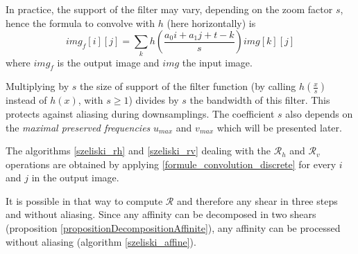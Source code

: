 \noindent	In practice, the support of the filter may vary, depending on the zoom factor $s$, hence the formula to convolve with $h$ (here horizontally) is 
	\begin{equation}
	img_f[i][j] = \displaystyle{\sum_k}h\left(\frac{a_0i+a_1j+t-k}{s}\right)img[k][j]
	\label{formule_convolution_discrete}
	\end{equation}
	where $img_f$ is the output image and $img$ the input image.
	
	
	
	
\noindent	Multiplying by $s$ the size of support of the filter function (by calling $h(\frac{x}{s})$ instead of $h(x)$, with $s\geq 1$) divides by $s$ the bandwidth of this filter. This protects against aliasing during downsamplings. The coefficient $s$ also depends on the \emph{maximal preserved frequencies} $u_{max}$ and $v_{max}$ which will be presented later.
	
	
	The algorithms \ref{szeliski_rh} and \ref{szeliski_rv} dealing with the $\mathcal R_h$ and $\mathcal R_v$ operations are obtained by applying \eqref{formule_convolution_discrete} for every $i$ and $j$ in the output image. \label{szeliski_rv_rh_section}
	
	
	\noindent It is possible in that way to compute $\mathcal R$ and therefore any shear  in three steps and without aliasing. Since any affinity can be decomposed in two shears (proposition \ref{propositionDecompositionAffinite}), any affinity can be processed without aliasing (algorithm \ref{szeliski_affine}).
	

